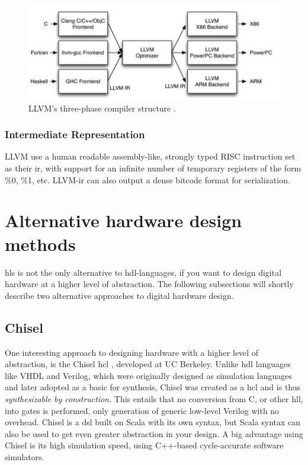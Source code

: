 \begin{figure}[hbpt]
\centering
\includegraphics[width=\textwidth]{../figs/LLVMCompiler.jpg}
\caption{\label{fig:llvmcompiler}LLVM's three-phase compiler structure \cite{llvmarch}.}
\end{figure}

\subsubsection{Intermediate Representation}
LLVM use a human readable assembly-like, strongly typed RISC instruction set as their \gls{ir}, with support for an infinite number of temporary registers of the form \%0, \%1, etc. LLVM-\gls{ir} can also output a dense bitcode format for serialization.

\section{Alternative hardware design methods}
\gls{hls} is not the only alternative to \gls{hdl}-languages, if you want to design digital hardware at a higher level of abstraction. The following subsections will shortly describe two alternative approaches to digital hardware design. 
\subsection{Chisel}
One interesting approach to designing hardware with a higher level of abstraction, is the Chisel \gls{hcl} \cite{bachrach2012chisel}, developed at UC Berkeley. Unlike \gls{hdl} languages like VHDL and Verilog, which were originally designed as simulation languages and later adopted as a basic for synthesis, Chisel was created as a \gls{hcl} and is thus \textit{synthesizable by construction}. This entails that no conversion from C, or other \gls{hll}, into gates is performed, only generation of generic low-level Verilog with no overhead. Chisel is a \gls{dsl} built on Scala \cite{odersky2004overview} with its own syntax, but Scala syntax can also be used to get even greater abstraction in your design. A big advantage using Chisel is its high simulation speed, using C++-based cycle-accurate software simulators.

